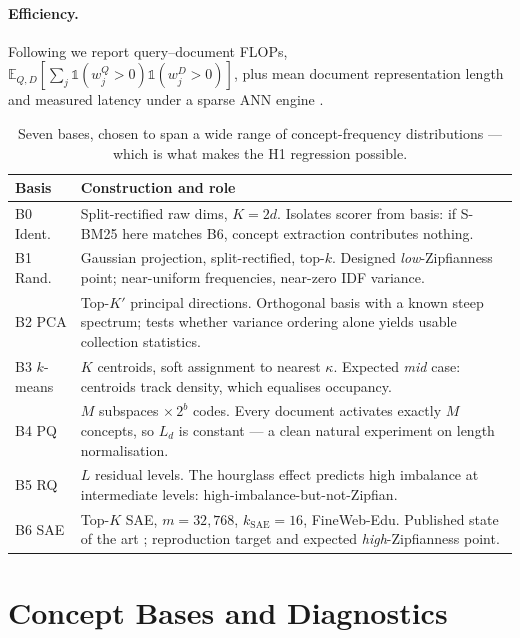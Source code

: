 \documentclass[11pt]{article}
\begin{document}
\paragraph{Efficiency.} Following \citet{zong2026tokens} we report query--document FLOPs, $\mathbb{E}_{Q,D}[\sum_j \mathbb{1}(w^Q_j\!>\!0)\mathbb{1}(w^D_j\!>\!0)]$, plus mean document representation length and measured latency under a sparse ANN engine \citep{bruch2024seismic}.

\begin{table}[t]
\centering\small
\begin{tabular}{@{}p{0.9cm}p{5.8cm}@{}}
\toprule
Basis & Construction and role \\
\midrule
B0 Ident. & Split-rectified raw dims, $K{=}2d$. Isolates scorer from basis: if S-BM25 here matches B6, concept extraction contributes nothing. \\
B1 Rand. & Gaussian projection, split-rectified, top-$k$. Designed \emph{low}-Zipfianness point; near-uniform frequencies, near-zero IDF variance. \\
B2 PCA & Top-$K'$ principal directions. Orthogonal basis with a known steep spectrum; tests whether variance ordering alone yields usable collection statistics. \\
B3 $k$-means & $K$ centroids, soft assignment to nearest $\kappa$. Expected \emph{mid} case: centroids track density, which equalises occupancy. \\
B4 PQ & $M$ subspaces $\times\,2^b$ codes. Every document activates exactly $M$ concepts, so $L_d$ is constant --- a clean natural experiment on length normalisation. \\
B5 RQ & $L$ residual levels. The hourglass effect \citep{zhu2024hourglass} predicts high imbalance at intermediate levels: high-imbalance-but-not-Zipfian. \\
B6 SAE & Top-$K$ SAE, $m{=}32{,}768$, $k_{\text{SAE}}{=}16$, FineWeb-Edu. Published state of the art \citep{clavie2026latent}; reproduction target and expected \emph{high}-Zipfianness point. \\
\bottomrule
\end{tabular}
\caption{Seven bases, chosen to span a wide range of concept-frequency distributions --- which is what makes the H1 regression possible.}
\label{tab:bases}
\end{table}

\section{Concept Bases and Diagnostics}
\end{document}
